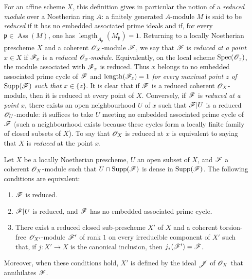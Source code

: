 For an affine scheme $X$, this definition gives in particular the notion of a \emph{reduced module} over a Noetherian ring $A$: a finitely generated $A$-module $M$ is said to be \emph{reduced} if it has no embedded associated prime ideals and if, for every $\mathfrak{p}\in\operatorname{Ass}(M)$, one has $\operatorname{length}_{A_\mathfrak{p}}(M_\mathfrak{p})=1$.
Returning to a locally Noetherian prescheme $X$ and a coherent $\mathscr{O}_X$-module $\mathscr{F}$, we say that $\mathscr{F}$ is \emph{reduced at a point} $x\in X$ if $\mathscr{F}_x$ is a \emph{reduced $\mathscr{O}_x$-module}.  Equivalently, on the local scheme $\operatorname{Spec}(\mathscr{O}_x)$, the module associated with $\mathscr{F}_x$ is reduced.  Thus $x$ belongs to no embedded associated prime cycle of $\mathscr{F}$ and $\operatorname{length}(\mathscr{F}_z)=1$ \emph{for every maximal point $z$ of $\operatorname{Supp}(\mathscr{F})$ such that $x\in\overline{\{z\}}$}.
It is clear that if $\mathscr{F}$ is a reduced coherent $\mathscr{O}_X$-module, then it is reduced at every point of $X$.  Conversely, if $\mathscr{F}$ is \emph{reduced at a point} $x$, there exists an open neighbourhood $U$ of $x$ such that $\mathscr{F}|U$ is a reduced $\mathscr{O}_U$-module: it suffices to take $U$ meeting no embedded associated prime cycle of $\mathscr{F}$ (such a neighbourhood exists because these cycles form a locally finite family of closed subsets of $X$).
To say that $\mathscr{O}_X$ is reduced at $x$ is equivalent to saying that $X$ is \emph{reduced} at the point $x$.


\begin{proposition}[3.2.3]
\label{IV.3.2.3}
Let $X$ be a locally Noetherian prescheme, $U$ an open subset of $X$, and $\mathscr{F}$ a coherent $\mathscr{O}_X$-module such that $U\cap\operatorname{Supp}(\mathscr{F})$ is dense in $\operatorname{Supp}(\mathscr{F})$.
The following conditions are equivalent:
\begin{enumerate}
  \item[\emph{a)}] $\mathscr{F}$ is reduced.
  \item[\emph{b)}] $\mathscr{F}|U$ is reduced, and $\mathscr{F}$ has no embedded associated prime cycle.
  \item[\emph{c)}] There exist a reduced closed sub-prescheme $X'$ of $X$ and a coherent torsion-free $\mathscr{O}_{X'}$-module $\mathscr{F}'$ of rank $1$ on every irreducible component of $X'$ such that, if $j:X'\to X$ is the canonical inclusion, then $j_*(\mathscr{F}')=\mathscr{F}$.
\end{enumerate}
Moreover, when these conditions hold, $X'$ is defined by the ideal $\mathscr{J}$ of $\mathscr{O}_X$ that annihilates $\mathscr{F}$.
\end{proposition}

